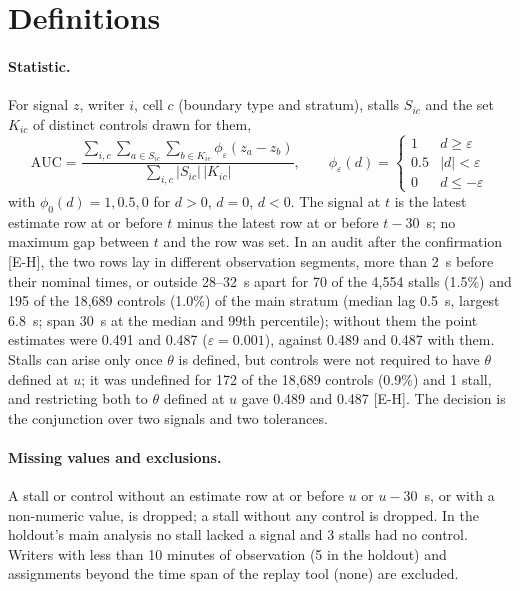 \section{Definitions}
\label{app:definitions}

\paragraph{Statistic.} For signal $z$, writer $i$, cell $c$ (boundary type and stratum), stalls $S_{ic}$ and the set
$K_{ic}$ of distinct controls drawn for them,
\[
\mathrm{AUC} = \frac{\sum_{i,c} \sum_{a \in S_{ic}} \sum_{b \in K_{ic}} \phi_\varepsilon(z_a - z_b)}
{\sum_{i,c} |S_{ic}|\,|K_{ic}|}, \qquad
\phi_\varepsilon(d) = \begin{cases} 1 & d \ge \varepsilon \\ 0.5 & |d| < \varepsilon \\ 0 & d \le -\varepsilon
\end{cases}
\]
with $\phi_0(d) = 1, 0.5, 0$ for $d > 0$, $d = 0$, $d < 0$. The signal at $t$ is the latest estimate row at or before $t$
minus the latest row at or before $t - 30$~s; no maximum gap between $t$ and the row was set. In an audit after the
confirmation [E-H], the two rows lay in different observation segments, more than 2~s before their nominal times, or
outside 28--32~s apart for 70 of the 4,554 stalls (1.5\%) and 195 of the 18,689 controls (1.0\%) of the main stratum
(median lag 0.5~s, largest 6.8~s; span 30~s at the median and 99th percentile); without them the point estimates were
0.491 and 0.487 ($\varepsilon = 0.001$), against 0.489 and 0.487 with them. Stalls can arise only once $\theta$ is
defined, but controls were not required to have $\theta$ defined at $u$; it was undefined for 172 of the 18,689 controls
(0.9\%) and 1 stall, and restricting both to $\theta$ defined at $u$ gave 0.489 and 0.487 [E-H]. The decision is the conjunction over two
signals and two tolerances.

\paragraph{Missing values and exclusions.} A stall or control without an estimate row at or before $u$ or $u - 30$~s, or
with a non-numeric value, is dropped; a stall without any control is dropped. In the holdout's main analysis no stall
lacked a signal and 3 stalls had no control. Writers with less than 10 minutes of observation (5 in the holdout) and
assignments beyond the time span of the replay tool (none) are excluded.

